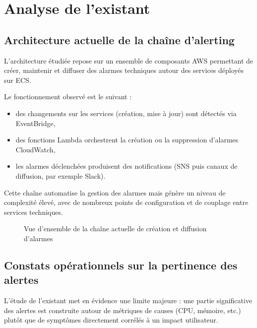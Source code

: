 \chapter{Analyse de l'existant}

\section{Architecture actuelle de la chaîne d'alerting}

L'architecture étudiée repose sur un ensemble de composants AWS permettant de créer, maintenir et diffuser des
alarmes techniques autour des services déployés sur ECS.

Le fonctionnement observé est le suivant :
\begin{itemize}
	\item des changements sur les services (création, mise à jour) sont détectés via EventBridge,
	\item des fonctions Lambda orchestrent la création ou la suppression d'alarmes CloudWatch,
	\item les alarmes déclenchées produisent des notifications (SNS puis canaux de diffusion, par exemple Slack).
\end{itemize}

Cette chaîne automatise la gestion des alarmes mais génère un niveau de complexité élevé, avec de nombreux points
de configuration et de couplage entre services techniques.

\begin{figure}[h]
	\centering
	\caption{Vue d'ensemble de la chaîne actuelle de création et diffusion d'alarmes}
	\label{fig:archi-alerting-actuelle}
\end{figure}

\section{Constats opérationnels sur la pertinence des alertes}

L'étude de l'existant met en évidence une limite majeure : une partie significative des alertes est construite autour
de métriques de causes (CPU, mémoire, etc.) plutôt que de symptômes directement corrélés à un impact utilisateur.

